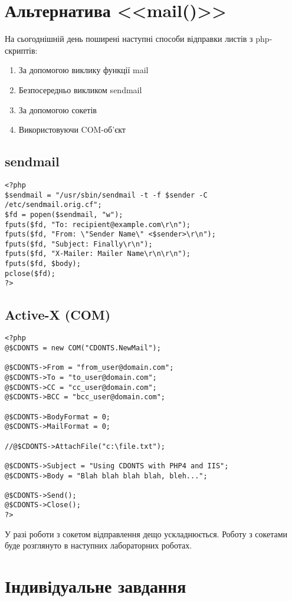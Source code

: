 \section{Альтернатива <<mail()>>}
На сьогоднішній день поширені наступні способи відправки листів з php-скриптів:
\begin{enumerate}
\item За допомогою виклику функції mail
\item Безпосередньо викликом sendmail
\item За допомогою сокетів
\item Використовуючи COM-об'єкт 
\end{enumerate}
\subsection*{sendmail}
\begin{lstlisting}[caption=Використання sendmail]
<?php
$sendmail = "/usr/sbin/sendmail -t -f $sender -C /etc/sendmail.orig.cf";
$fd = popen($sendmail, "w");
fputs($fd, "To: recipient@example.com\r\n");
fputs($fd, "From: \"Sender Name\" <$sender>\r\n");
fputs($fd, "Subject: Finally\r\n");
fputs($fd, "X-Mailer: Mailer Name\r\n\r\n");
fputs($fd, $body);
pclose($fd);
?> 
\end{lstlisting}
\subsection*{Active-X (COM)}
\begin{lstlisting}[caption=Використання Active-X]
<?php
@$CDONTS = new COM("CDONTS.NewMail");

@$CDONTS->From = "from_user@domain.com";
@$CDONTS->To = "to_user@domain.com";
@$CDONTS->CC = "cc_user@domain.com";
@$CDONTS->BCC = "bcc_user@domain.com";

@$CDONTS->BodyFormat = 0;
@$CDONTS->MailFormat = 0;

//@$CDONTS->AttachFile("c:\file.txt");

@$CDONTS->Subject = "Using CDONTS with PHP4 and IIS";
@$CDONTS->Body = "Blah blah blah blah, bleh...";

@$CDONTS->Send();
@$CDONTS->Close();
?> 
\end{lstlisting}

У разі роботи з сокетом відправлення дещо ускладнюється. Роботу з сокетами буде розглянуто в наступних лабораторних роботах.

\pagebreak[3]
\section{Індивідуальне завдання}

